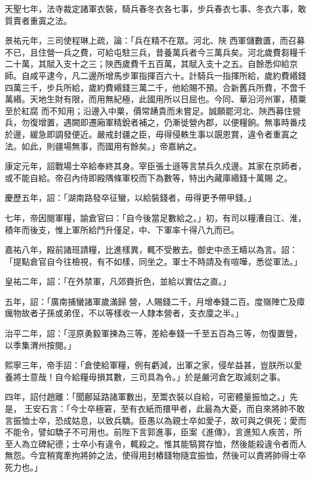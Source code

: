 \begin{pinyinscope}
 天聖七年，法寺裁定諸軍衣裝，騎兵春冬衣各七事，步兵春衣七事、冬衣六事，敢質賣者重寘之法。



 景祐元年，三司使程琳上疏，論：「兵在精不在眾。河北、陜
 西軍儲數匱，而召募不已，且住營一兵之費，可給屯駐三兵，昔養萬兵者今三萬兵矣。河北歲費芻糧千二十萬，其賦入支十之三；陜西歲費千五百萬，其賦入支十之五。自餘悉仰給京師。自咸平逮今，凡二邊所增馬步軍指揮百六十。計騎兵一指揮所給，歲約費緡錢四萬三千，步兵所給，歲約費緡錢三萬二千，他給賜不預。合新舊兵所費，不啻千萬緡。天地生財有限，而用無紀極，此國用所以日屈也。今同、華沿河州軍，積粟至於紅腐
 而不知用；沿邊入中粟，價常踴貴而未嘗足。誠願罷河北、陜西募住營兵，勿復增置，遇闕即遷廂軍精銳者補之，仍漸徙營內郡，以便糧餉。無事時番戍於邊，緩急即調發便近。嚴戒封疆之臣，毋得侵軼生事以覬恩賞，違令者重寘之法。如此，則疆場無事，而國用有餘矣。」帝嘉納之。



 康定元年，詔戰場士卒給奉終其身。宰臣張士遜等言禁兵久戍邊。其家在京師者，或不能自給。帝召內侍即殿隅條軍校而下為數等，特出內藏庫緡錢十萬賜
 之。



 慶歷五年，詔：「湖南路發卒征蠻，以給裝錢者，毋得更予帶甲錢。」



 七年，帝因閱軍糧，諭倉官曰：「自今後當足數給之。」初，有司以糧漕自江、淮，積年而後支，惟上軍所給鬥升僅足，中、下軍率十得八九而已。



 嘉祐八年，殿前諸班請糧，比進樣異，輒不受散去。御史中丞王疇以為言。詔：「提點倉官自今往檢視，有不如樣，同坐之。軍士不時請及有喧嘩，悉從軍法。」



 皇祐二年，詔：「在外禁軍，凡郊賚折色，並給以實估之直。」



 五年，詔：「廣南捕蠻諸軍歲滿歸
 營，人賜錢二千，月增奉錢二百。度嶺陣亡及瘴癘物故者子孫或弟侄，不以等樣收一人隸本營者，支衣廩之半。」



 治平二年，詔：「涇原勇毅軍揀為三等，差給奉錢一千至五百為三等，勿復置營，以季集渭州按閱。」



 熙寧三年，帝手詔：「倉使給軍糧，例有虧減，出軍之家，侵牟益甚，豈朕所以愛養將士意哉！自今給糧毋損其數，三司具為令。」於是嚴河倉乞取減刻之事。



 四年，詔付趙離：「聞鄜延路諸軍數出，至鬻衣裝以自給，可密體量振恤之。」先是，
 王安石言：「今士卒極窘，至有衣紙而擐甲者，此最為大憂，而自來將帥不敢言振恤士卒，恐成姑息，以致兵驕。臣愚以為親士卒如愛子，故可與之俱死；愛而不能令，譬如驕子不可用也。前陛下言郭進事，臣案《進傳》，言進知人疾苦，所至人為立碑紀德；士卒小有違令，輒殺之。惟其能犒賞存恤，然後能殺違令者而人無怨。今宜稍寬牽拘將帥之法，使得用封樁錢物隨宜振恤，然後可以責將帥得士卒死力也。」




\end{pinyinscope}

